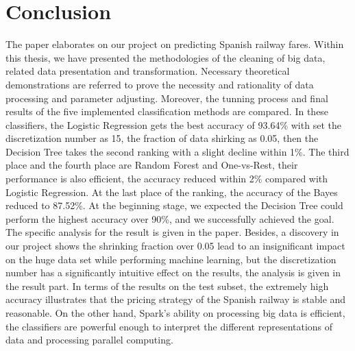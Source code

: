 \documentclass[conference]{IEEEtran}
\begin{document}
\section{Conclusion}
The paper elaborates on our project on predicting Spanish railway fares. Within this thesis, we have presented the methodologies of the cleaning of big data, related data presentation and transformation. Necessary theoretical demonstrations are referred to prove the necessity and rationality of data processing and parameter adjusting. Moreover, the tunning process and final results of the five implemented classification methods are compared. In these classifiers, the Logistic Regression gets the best accuracy of 93.64\% with set the discretization number as 15, the fraction of data shirking as 0.05, then the Decision Tree takes the second ranking with a slight decline within 1\%. The third place and the fourth place are Random Forest and One-vs-Rest, their performance is also efficient, the accuracy reduced within 2\% compared with Logistic Regression. At the last place of the ranking, the accuracy of the Bayes reduced to 87.52\%. At the beginning stage, we expected the Decision Tree could perform the highest accuracy over 90\%, and we successfully achieved the goal. The specific analysis for the result is given in the paper. Besides, a discovery in our project shows the shrinking fraction over 0.05 lead to an insignificant impact on the huge data set while performing machine learning, but the discretization number has a significantly intuitive effect on the results, the analysis is given in the result part. In terms of the results on the test subset, the extremely high accuracy illustrates that the pricing strategy of the Spanish railway is stable and reasonable. On the other hand, Spark’s ability on processing big data is efficient, the classifiers are powerful enough to interpret the different representations of data and processing parallel computing.
\end{document}

